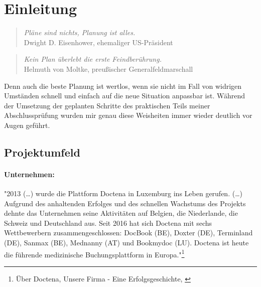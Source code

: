 \section{Einleitung}
\label{sec:Einleitung}
\begin{center}
\begin{quote}
\textit{Pläne sind nichts, Planung ist alles.}\\Dwight D. Eisenhower, ehemaliger US-Präsident
\end{quote}
\begin{quote}
\textit{Kein Plan überlebt die erste Feindberührung.}\\
Helmuth von Moltke, preußischer Generalfeldmarschall
\end{quote}
\end{center}

Denn auch die beste Planung ist wertlos, wenn sie nicht im Fall von widrigen Umständen schnell und einfach auf die neue Situation anpassbar ist. Während der Umsetzung der geplanten Schritte des praktischen Teils meiner Abschlussprüfung wurden mir genau diese Weisheiten immer wieder deutlich vor Augen geführt.

\subsection{Projektumfeld} 
\label{sec:Projektumfeld}
\paragraph*{Unternehmen: }"2013 (\dots) wurde die Plattform Doctena in Luxemburg ins Leben gerufen. (\dots) Aufgrund des anhaltenden Erfolges und des schnellen Wachstums des Projekts dehnte das Unternehmen seine Aktivitäten auf Belgien, die Niederlande, die Schweiz und Deutschland aus. Seit 2016 hat sich Doctena mit sechs Wettbewerbern zusammengeschlossen: DocBook (BE), Doxter (DE), Terminland (DE), Sanmax (BE), Mednanny (AT) und Bookmydoc (LU). Doctena ist heute die führende medizinische Buchungsplattform in Europa."\footnote{Über Doctena, Unsere Firma - Eine Erfolgsgeschichte, \cite{wwwDoctenaCom} }

